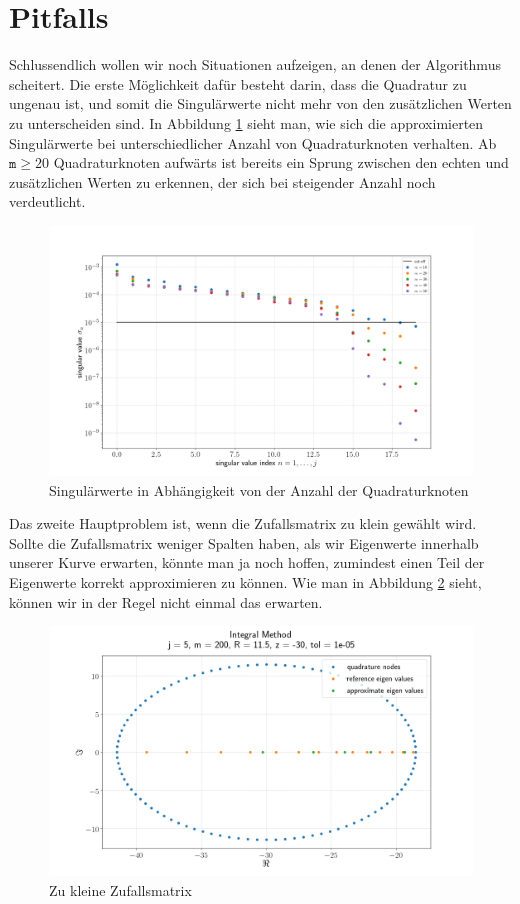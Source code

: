 \section{Pitfalls}

Schlussendlich wollen wir noch Situationen aufzeigen, an denen der Algorithmus scheitert.
Die erste Möglichkeit dafür besteht darin, dass die Quadratur zu ungenau ist, und somit die  Singulärwerte nicht mehr von den zusätzlichen Werten zu unterscheiden sind.
In Abbildung \ref{fig:plot4} sieht man, wie sich die approximierten Singulärwerte bei unterschiedlicher Anzahl von Quadraturknoten verhalten.
Ab $\texttt{m} \geq 20$ Quadraturknoten aufwärts ist bereits ein Sprung zwischen den echten und zusätzlichen Werten zu erkennen, der sich bei steigender Anzahl noch verdeutlicht.

\begin{figure}[H]
  \includegraphics[width = \linewidth]{Plots/singulaerwerte_quadraturknoten.png}
  \caption{Singulärwerte in Abhängigkeit von der Anzahl der Quadraturknoten}
  \label{fig:plot4}
\end{figure}

Das zweite Hauptproblem ist, wenn die Zufallsmatrix zu klein gewählt wird.
Sollte die Zufallsmatrix weniger Spalten haben, als wir Eigenwerte innerhalb unserer Kurve erwarten, könnte man ja noch hoffen, zumindest einen Teil der Eigenwerte korrekt approximieren zu können.
Wie man in Abbildung \ref{fig:plot5} sieht, können wir in der Regel nicht einmal das erwarten.

\begin{figure}[H]
  \includegraphics[width = \linewidth]{Plots/zufallsmatrix_zu_klein.png}
  \caption{Zu kleine Zufallsmatrix}
  \label{fig:plot5}
\end{figure}
